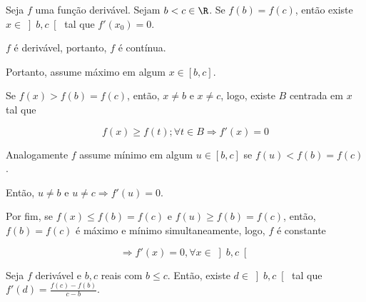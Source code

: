 \documentclass[11pt, oneside, a4paper]{gsm-l}
\begin{document}
\begin{teo}
\label{tr}
\begin{sloppypar}
Seja $f$ uma função derivável. Sejam ${b < c \in \R}$. Se $f\left( b \right) = f\left( c \right)$, então existe $x \in \left] {b,c} \right[$ tal que $f'\left( {x_0 } \right) = 0$.
\end{sloppypar}
\end{teo}

\begin{dem}
$f$ é derivável, portanto, $f$ é contínua.

Portanto, assume máximo em algum $x \in \left[ {b,c} \right]$.

    Se $f\left( x \right) > f\left( b \right) = f\left( c \right)$, então, $x \ne b$ e $x \ne c$, logo, existe $B$ centrada em $x$ tal que

\[
    f\left( x \right) \geqslant f\left( t \right);\forall t \in B \Rightarrow f'\left( x \right) = 0
\]

    Analogamente $f$ assume mínimo em algum $u \in \left[ {b,c} \right]$ se $f\left( u \right) < f\left( b \right) = f\left( c \right)$.

Então, $u \ne b$ e $u \ne c \Rightarrow f'\left( u \right) = 0$.

    Por fim, se $f\left( x \right) \leqslant f\left( b \right) = f\left( c \right)$ e $f\left( u \right) \geqslant f\left( b \right) = f\left( c \right)$, então, $f\left( b \right) = f\left( c \right)$ é máximo e mínimo simultaneamente, logo, $f$ é constante

\[
\Rightarrow f'\left( x \right) = 0,\forall x \in \left] {b,c} \right[
\]

\end{dem}

\newpage 

\begin{teo}
\label{tvm}
Seja $f$ derivável e $b,c$ reais com $b \leqslant c$. Então, existe $d \in \left] {b,c} \right[$ tal que $\displaystyle f'\left( d \right) = \frac{{f\left( c \right) - f\left( b \right)}}{{c - b}}$.
\end{teo}
\end{document}
